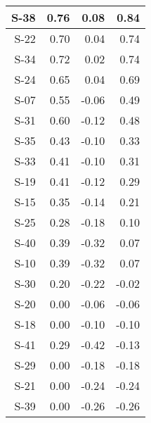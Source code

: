 \begin{tabular}{ | r | r | r | r | }
    \hline
                  S-38  &            0.76  &            0.08  &            0.84  \\
    \hline
                  S-22  &            0.70  &            0.04  &            0.74  \\
    \hline
                  S-34  &            0.72  &            0.02  &            0.74  \\
    \hline
                  S-24  &            0.65  &            0.04  &            0.69  \\
    \hline
                  S-07  &            0.55  &           -0.06  &            0.49  \\
    \hline
                  S-31  &            0.60  &           -0.12  &            0.48  \\
    \hline
                  S-35  &            0.43  &           -0.10  &            0.33  \\
    \hline
                  S-33  &            0.41  &           -0.10  &            0.31  \\
    \hline
                  S-19  &            0.41  &           -0.12  &            0.29  \\
    \hline
                  S-15  &            0.35  &           -0.14  &            0.21  \\
    \hline
                  S-25  &            0.28  &           -0.18  &            0.10  \\
    \hline
                  S-40  &            0.39  &           -0.32  &            0.07  \\
    \hline
                  S-10  &            0.39  &           -0.32  &            0.07  \\
    \hline
                  S-30  &            0.20  &           -0.22  &           -0.02  \\
    \hline
                  S-20  &            0.00  &           -0.06  &           -0.06  \\
    \hline
                  S-18  &            0.00  &           -0.10  &           -0.10  \\
    \hline
                  S-41  &            0.29  &           -0.42  &           -0.13  \\
    \hline
                  S-29  &            0.00  &           -0.18  &           -0.18  \\
    \hline
                  S-21  &            0.00  &           -0.24  &           -0.24  \\
    \hline
                  S-39  &            0.00  &           -0.26  &           -0.26  \\

\end{tabular}
